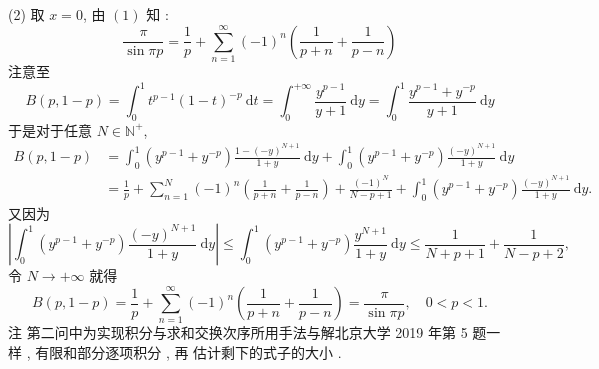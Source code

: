 \documentclass[10pt]{article}
\begin{document}
{(2)  取  $x=0$,  由  $(1)$  知 :
$$
\frac{\pi}{\sin \pi p}=\frac{1}{p}+\sum_{n=1}^{\infty}(-1)^{n}\left(\frac{1}{p+n}+\frac{1}{p-n}\right)
$$
 注意至 
$$
B(p, 1-p)=\int_{0}^{1} t^{p-1}(1-t)^{-p} \mathrm{~d} t=\int_{0}^{+\infty} \frac{y^{p-1}}{y+1} \mathrm{~d} y=\int_{0}^{1} \frac{y^{p-1}+y^{-p}}{y+1} \mathrm{~d} y
$$
 于是对于任意  $N \in \mathbb{N}^{+}$,
$$
\begin{aligned}
B(p, 1-p) &=\int_{0}^{1}\left(y^{p-1}+y^{-p}\right) \frac{1-(-y)^{N+1}}{1+y} \mathrm{~d} y+\int_{0}^{1}\left(y^{p-1}+y^{-p}\right) \frac{(-y)^{N+1}}{1+y} \mathrm{~d} y \\
&=\frac{1}{p}+\sum_{n=1}^{N}(-1)^{n}\left(\frac{1}{p+n}+\frac{1}{p-n}\right)+\frac{(-1)^{N}}{N-p+1}+\int_{0}^{1}\left(y^{p-1}+y^{-p}\right) \frac{(-y)^{N+1}}{1+y} \mathrm{~d} y .
\end{aligned}
$$
 又因为 
$$
\left|\int_{0}^{1}\left(y^{p-1}+y^{-p}\right) \frac{(-y)^{N+1}}{1+y} \mathrm{~d} y\right| \leqslant \int_{0}^{1}\left(y^{p-1}+y^{-p}\right) \frac{y^{N+1}}{1+y} \mathrm{~d} y \leqslant \frac{1}{N+p+1}+\frac{1}{N-p+2},
$$
 令  $N \rightarrow+\infty$  就得 
$$
B(p, 1-p)=\frac{1}{p}+\sum_{n=1}^{\infty}(-1)^{n}\left(\frac{1}{p+n}+\frac{1}{p-n}\right)=\frac{\pi}{\sin \pi p}, \quad 0<p<1 .
$$
 注   第二问中为实现积分与求和交换次序所用手法与解北京大学  2019  年第  5  题一样 ,  有限和部分逐项积分 ,  再   估计剩下的式子的大小 .

}
\end{document}
